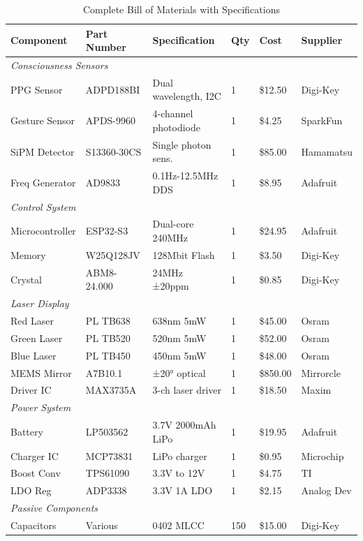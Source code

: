 \documentclass[12pt,a4paper]{article}
\begin{document}
\begin{table}[H]
\centering
\caption{Complete Bill of Materials with Specifications}
\label{tab:bom}
\begin{tabular}{llllll}
\toprule
\textbf{Component} & \textbf{Part Number} & \textbf{Specification} & \textbf{Qty} & \textbf{Cost} & \textbf{Supplier} \\
\midrule
\multicolumn{6}{l}{\textit{Consciousness Sensors}} \\
PPG Sensor & ADPD188BI & Dual wavelength, I2C & 1 & \$12.50 & Digi-Key \\
Gesture Sensor & APDS-9960 & 4-channel photodiode & 1 & \$4.25 & SparkFun \\
SiPM Detector & S13360-30CS & Single photon sens. & 1 & \$85.00 & Hamamatsu \\
Freq Generator & AD9833 & 0.1Hz-12.5MHz DDS & 1 & \$8.95 & Adafruit \\
\midrule
\multicolumn{6}{l}{\textit{Control System}} \\
Microcontroller & ESP32-S3 & Dual-core 240MHz & 1 & \$24.95 & Adafruit \\
Memory & W25Q128JV & 128Mbit Flash & 1 & \$3.50 & Digi-Key \\
Crystal & ABM8-24.000 & 24MHz ±20ppm & 1 & \$0.85 & Digi-Key \\
\midrule
\multicolumn{6}{l}{\textit{Laser Display}} \\
Red Laser & PL TB638 & 638nm 5mW & 1 & \$45.00 & Osram \\
Green Laser & PL TB520 & 520nm 5mW & 1 & \$52.00 & Osram \\
Blue Laser & PL TB450 & 450nm 5mW & 1 & \$48.00 & Osram \\
MEMS Mirror & A7B10.1 & ±20° optical & 1 & \$850.00 & Mirrorcle \\
Driver IC & MAX3735A & 3-ch laser driver & 1 & \$18.50 & Maxim \\
\midrule
\multicolumn{6}{l}{\textit{Power System}} \\
Battery & LP503562 & 3.7V 2000mAh LiPo & 1 & \$19.95 & Adafruit \\
Charger IC & MCP73831 & LiPo charger & 1 & \$0.95 & Microchip \\
Boost Conv & TPS61090 & 3.3V to 12V & 1 & \$4.75 & TI \\
LDO Reg & ADP3338 & 3.3V 1A LDO & 1 & \$2.15 & Analog Dev \\
\midrule
\multicolumn{6}{l}{\textit{Passive Components}} \\
Capacitors & Various & 0402 MLCC & 150 & \$15.00 & Digi-Key \\

\end{tabular}
\end{table}
\end{document}
